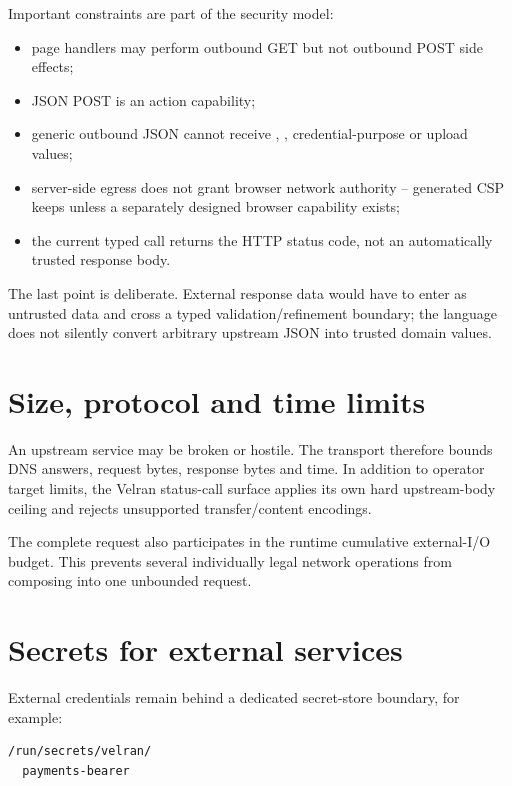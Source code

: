 Important constraints are part of the security model:

\begin{itemize}
  \item page handlers may perform outbound GET but not outbound POST side effects;
  \item JSON POST is an action capability;
  \item generic outbound JSON cannot receive , , credential-purpose or upload values;
  \item server-side egress does not grant browser network authority -- generated CSP keeps  unless a separately designed browser capability exists;
  \item the current typed call returns the HTTP status code, not an automatically trusted response body.
\end{itemize}

The last point is deliberate. External response data would have to enter as untrusted data and cross a typed validation/refinement boundary; the language does not silently convert arbitrary upstream JSON into trusted domain values.

\section{Size, protocol and time limits}

An upstream service may be broken or hostile. The transport therefore bounds DNS answers, request bytes, response bytes and time. In addition to operator target limits, the Velran status-call surface applies its own hard upstream-body ceiling and rejects unsupported transfer/content encodings.

The complete request also participates in the runtime cumulative external-I/O budget. This prevents several individually legal network operations from composing into one unbounded request.

\section{Secrets for external services}

External credentials remain behind a dedicated secret-store boundary, for example:

\begin{lstlisting}
/run/secrets/velran/
  payments-bearer
\end{lstlisting}

